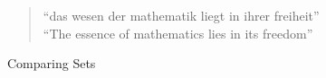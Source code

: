 \begin{frame}{}

  \pause
  \begin{quote}
    \begin{center}
    ``das wesen der mathematik liegt in ihrer freiheit'' \\[8pt]
    \pause
    ``The essence of mathematics lies in its freedom''
    \end{center}
  \end{quote}
\end{frame}

\begin{frame}{}

  \vspace{0.30cm}
  \centerline{\LARGE Comparing Sets}

  \pause
  \begin{columns}
  \end{columns}
\end{frame}


